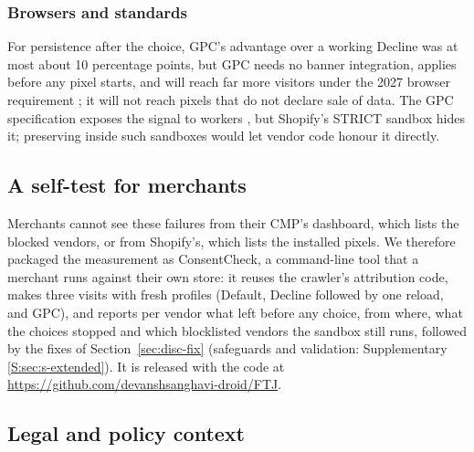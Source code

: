 \subsubsection*{Browsers and standards}
For persistence after the choice, GPC's advantage over a working Decline was at most about 10 percentage points, but GPC needs no banner integration, applies before any pixel starts, and will reach far more visitors under the 2027 browser requirement \citep{ab566,gpc_site}; it will not reach pixels that do not declare sale of data. The GPC specification exposes the signal to workers \citep{w3c_gpc}, but Shopify's STRICT sandbox hides it; preserving  inside such sandboxes would let vendor code honour it directly.

\subsection{A self-test for merchants}\label{sec:disc-tool}

Merchants cannot see these failures from their CMP's dashboard, which lists the blocked vendors, or from Shopify's, which lists the installed pixels. We therefore packaged the measurement as ConsentCheck, a command-line tool that a merchant runs against their own store: it reuses the crawler's attribution code, makes three visits with fresh profiles (Default, Decline followed by one reload, and GPC), and reports per vendor what left before any choice, from where, what the choices stopped and which blocklisted vendors the sandbox still runs, followed by the fixes of Section~\ref{sec:disc-fix} (safeguards and validation: Supplementary \ref*{S:sec:s-extended}). It is released with the code at \url{https://github.com/devanshsanghavi-droid/FTJ}.

\subsection{Legal and policy context}\label{sec:disc-law}

